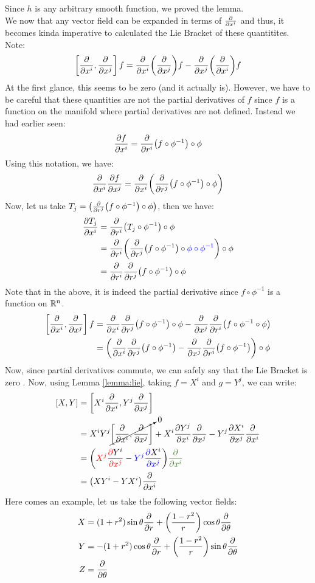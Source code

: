Since $h$ is any arbitrary smooth function, we proved the lemma.\\[0.2cm]
We now that any vector field can be expanded in terms of $\pdv{x^i}$ and thus, it becomes kinda imperative to calculated the Lie Bracket of these quantitites. Note:
$$\left[ \pdv{x^i}, \pdv{x^j} \right]f =\pdv{x^i}\qty(\pdv{x^j})f - \pdv{x^j}\qty(\pdv{x^i})f $$ 
At the first glance, this seems to be zero (and it actually is). However, we have to be careful that these quantities are not the partial derivatives of $f$ since $f$ is a function on the manifold where partial derivatives are not defined. Instead we had earlier seen:
$$\pdv{f}{x^i} = \pdv{r^i}\qty(f\circ \phi^{-1})\circ \phi$$
Using this notation, we have:
\begin{align*}
  \pdv{x^i}\pdv{f}{x^j} = \pdv{x^i}\qty(\pdv{r^j}\qty(f\circ \phi^{-1})\circ \phi)
\end{align*}
Now, let us take $T_j = {\qty(\pdv{r^j}\qty(f\circ \phi^{-1})\circ \phi)}$, then we have:
\begin{align*}
  \pdv{T_j}{x^i} &= \pdv{r^i}\qty({T_j}\circ \phi^{-1})\circ \phi\\
  &= \pdv{r^i}\qty(\pdv{r^j}\qty(f\circ \phi^{-1})\circ \mathcolor{blue}{\phi\circ \phi^{-1}})\circ\phi\\
  &= \pdv{r^i}\pdv{r^j}\qty(f\circ \phi^{-1})\circ\phi
\end{align*}
Note that in the above, it is indeed the partial derivative since $f\circ \phi^{-1}$ is a function on $\mathbb{R}^n$.
\begin{align*}
  \left[ \pdv{x^i}, \pdv{x^j} \right]f  &= \pdv{x^i}\pdv{r^j}\qty(f\circ \phi^{-1})\circ \phi - \pdv{x^j}\pdv{r^i}\qty(f\circ \phi^{-1}\circ \phi)\\
  &=\qty(\pdv{x^i}\pdv{r^j}\qty(f\circ \phi^{-1})-\pdv{x^j}\pdv{r^i}\qty(f\circ \phi^{-1}))\circ \phi
\end{align*}
Now, since partial derivatives commute, we can safely say that the Lie Bracket is zero . Now, using Lemma \ref{lemma:lie}, taking $f=X^i$ and $g = Y^j$, we can write:
\begin{align*}
  \comtr{X}{Y} &= \comtr{X^i \pdv{x^i}}{ Y^j \pdv{x^j}}\\
&=X^i Y^j \cancelto{0}{\comtr{\pdv{x^i}}{\pdv{x^j}}}+X^i\pdv{Y^j}{x^i}\pdv{x^j} - Y^j\pdv{X^i}{x^j}\pdv{x^i}\\
&=\qty(\mathcolor{red}{X^j}\frac{\mathcolor{red}{\partial} Y^i}{\mathcolor{red}{\partial x^j}}- \mathcolor{blue}{Y^j}\frac{\mathcolor{blue}{\partial} X^i}{\mathcolor{blue}{\partial x^j}})\mathcolor{OliveGreen}{\pdv{x^i}}\\
&=\qty(XY^i - YX^i)\pdv{x^i}
\end{align*}
Here comes an example,  let us take the following vector fields: 
\begin{align*}
  X &= (1+r^2)\sin\theta\pdv{r} + \qty(\frac{1-r^2}{r})\cos\theta\pdv{\theta}\\
Y&=-(1+r^2)\cos\theta\pdv{r} +\qty(\frac{1-r^2}{r})\sin\theta\pdv{\theta}\\
Z&=\pdv{\theta}
\end{align*}

